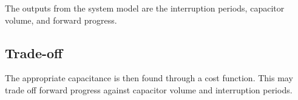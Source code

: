 The outputs from the system model are the interruption periods, capacitor volume, and forward progress.

\subsection{Trade-off}
The appropriate capacitance is then found through a cost function. This may trade off forward progress against capacitor volume and interruption periods.


